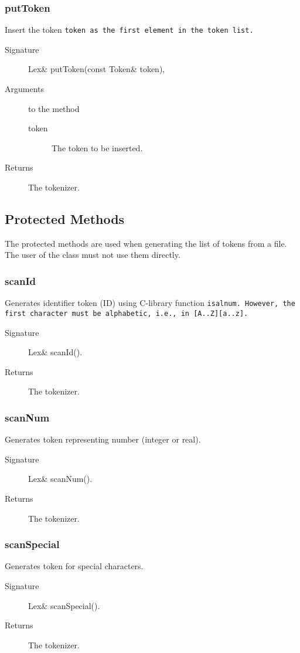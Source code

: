 \subsubsection{putToken}
Insert the token \tt token \rm as the first element in the token list. 
\begin{description}
  \item [Signature] Lex\& putToken(const Token\& token),
  \item [Arguments] to the method
    \begin{description}
      \item [token] The token to be inserted.
    \end{description}
   \item [Returns] The tokenizer.
\end{description}

\subsection{Protected Methods}
The protected methods are used when generating the list of tokens from
a file. The user of the class must not use them directly.
\subsubsection{scanId}
Generates identifier token (ID) using C-library function \tt isalnum\rm. 
However, the first character must be alphabetic, i.e., in [A..Z][a..z]. 
\begin{description}
  \item [Signature] Lex\& scanId().
  \item [Returns] The tokenizer.
\end{description}

\subsubsection{scanNum}  
Generates token representing number (integer or real).
\begin{description}
  \item [Signature] Lex\&  scanNum().
  \item [Returns] The tokenizer.
\end{description}

\subsubsection{scanSpecial}
Generates token for special characters. 
\begin{description}
  \item [Signature] Lex\&  scanSpecial().
  \item [Returns] The tokenizer.   
\end{description}

